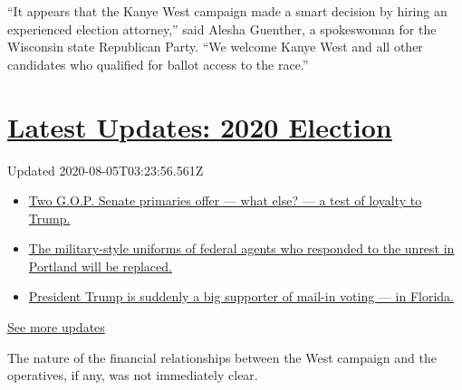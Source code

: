``It appears that the Kanye West campaign made a smart decision by
hiring an experienced election attorney,'' said Alesha Guenther, a
spokeswoman for the Wisconsin state Republican Party. ``We welcome Kanye
West and all other candidates who qualified for ballot access to the
race.''

\hypertarget{latest-updates-2020-election}{%
\section{\texorpdfstring{\href{https://www.nytimes.com/2020/08/04/us/elections/primary-election-michigan-arizona-kansas.html?action=click\&pgtype=Article\&state=default\&region=MAIN_CONTENT_1\&context=storylines_live_updates}{Latest
Updates: 2020
Election}}{Latest Updates: 2020 Election}}\label{latest-updates-2020-election}}

Updated 2020-08-05T03:23:56.561Z

\begin{itemize}
\tightlist
\item
  \href{https://www.nytimes.com/2020/08/04/us/elections/primary-election-michigan-arizona-kansas.html?action=click\&pgtype=Article\&state=default\&region=MAIN_CONTENT_1\&context=storylines_live_updates\#link-3924dd44}{Two
  G.O.P. Senate primaries offer --- what else? --- a test of loyalty to
  Trump.}
\item
  \href{https://www.nytimes.com/2020/08/04/us/elections/primary-election-michigan-arizona-kansas.html?action=click\&pgtype=Article\&state=default\&region=MAIN_CONTENT_1\&context=storylines_live_updates\#link-62a8e06b}{The
  military-style uniforms of federal agents who responded to the unrest
  in Portland will be replaced.}
\item
  \href{https://www.nytimes.com/2020/08/04/us/elections/primary-election-michigan-arizona-kansas.html?action=click\&pgtype=Article\&state=default\&region=MAIN_CONTENT_1\&context=storylines_live_updates\#link-32b39e33}{President
  Trump is suddenly a big supporter of mail-in voting --- in Florida.}
\end{itemize}

\href{https://www.nytimes.com/2020/08/04/us/elections/primary-election-michigan-arizona-kansas.html?action=click\&pgtype=Article\&state=default\&region=MAIN_CONTENT_1\&context=storylines_live_updates}{See
more updates}

The nature of the financial relationships between the West campaign and
the operatives, if any, was not immediately clear.

